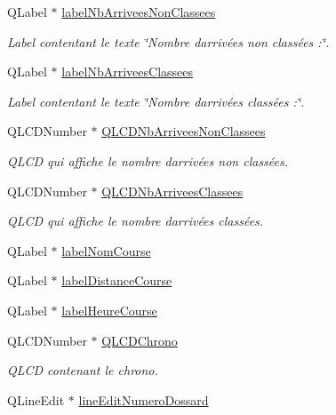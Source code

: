 \begin{DoxyCompactItemize}
Q\+Label $\ast$ \hyperlink{class_i_h_m_chrono_cross_a3249b3528e5b75353bb8fb80d27eefe3}{label\+Nb\+Arrivees\+Non\+Classees}
\begin{DoxyCompactList}\small\item\em Label contentant le texte \char`\"{}\+Nombre d\textquotesingle{}arrivées non classées \+:\char`\"{}. \end{DoxyCompactList}\item 
Q\+Label $\ast$ \hyperlink{class_i_h_m_chrono_cross_a08fd415de59fe6f42663f3f36f074e61}{label\+Nb\+Arrivees\+Classees}
\begin{DoxyCompactList}\small\item\em Label contentant le texte \char`\"{}\+Nombre d\textquotesingle{}arrivées classées \+:\char`\"{}. \end{DoxyCompactList}\item 
Q\+L\+C\+D\+Number $\ast$ \hyperlink{class_i_h_m_chrono_cross_a9cf1b999b13e69fdd0fb11ddb9011ed5}{Q\+L\+C\+D\+Nb\+Arrivees\+Non\+Classees}
\begin{DoxyCompactList}\small\item\em Q\+L\+CD qui affiche le nombre d\textquotesingle{}arrivées non classées. \end{DoxyCompactList}\item 
Q\+L\+C\+D\+Number $\ast$ \hyperlink{class_i_h_m_chrono_cross_aeba189eacad7e19e009ae4764f98b9be}{Q\+L\+C\+D\+Nb\+Arrivees\+Classees}
\begin{DoxyCompactList}\small\item\em Q\+L\+CD qui affiche le nombre d\textquotesingle{}arrivées classées. \end{DoxyCompactList}\item 
Q\+Label $\ast$ \hyperlink{class_i_h_m_chrono_cross_aebe86f4e614f568db5558bf99f1b44e6}{label\+Nom\+Course}
\item 
Q\+Label $\ast$ \hyperlink{class_i_h_m_chrono_cross_a4748740a4973bf62c408be380ac0ae77}{label\+Distance\+Course}
\item 
Q\+Label $\ast$ \hyperlink{class_i_h_m_chrono_cross_ad071b8c6ecc126fca3e17e58e83942d9}{label\+Heure\+Course}
\item 
Q\+L\+C\+D\+Number $\ast$ \hyperlink{class_i_h_m_chrono_cross_a6169c1483faab14d1f619d1d838c198e}{Q\+L\+C\+D\+Chrono}
\begin{DoxyCompactList}\small\item\em Q\+L\+CD contenant le chrono. \end{DoxyCompactList}\item 
Q\+Line\+Edit $\ast$ \hyperlink{class_i_h_m_chrono_cross_ad2e156ff9412644debf8da7a3ec1566d}{line\+Edit\+Numero\+Dossard}

\end{DoxyCompactItemize}
